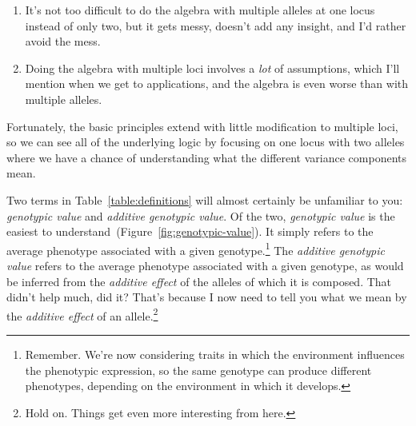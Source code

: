 \begin{enumerate}

\item It's not too difficult to do the algebra with multiple alleles
  at one locus instead of only two, but it gets messy, doesn't add any
  insight, and I'd rather avoid the mess.

\item Doing the algebra with multiple loci involves a {\it lot\/} of
  assumptions, which I'll mention when we get to applications, and the
  algebra is even worse than with multiple alleles.

\end{enumerate}

\noindent Fortunately, the basic principles extend with little
modification to multiple loci, so we can see all of the underlying
logic by focusing on one locus with two alleles where we have a chance
of understanding what the different variance components mean.

Two terms in Table~\ref{table:definitions} will almost certainly be
unfamiliar to you: {\it genotypic value\/} and {\it additive genotypic
  value}. Of the two, {\it genotypic value\/} is the easiest to
understand~(Figure~\ref{fig:genotypic-value}). It simply refers to the
average phenotype associated with a given
genotype.\footnote{Remember. We're now considering traits in which the
  environment influences the phenotypic expression, so the same
  genotype can produce different phenotypes, depending on the
  environment in which it develops.} The {\it additive genotypic
  value\/} refers to the average phenotype associated with a given
genotype, as would be inferred from the {\it additive effect\/} of the
alleles of which it is composed. That didn't help much, did it? That's
because I now need to tell you what we mean by the {\it additive
  effect\/} of an allele.\footnote{Hold on. Things get even more
  interesting from here.}

